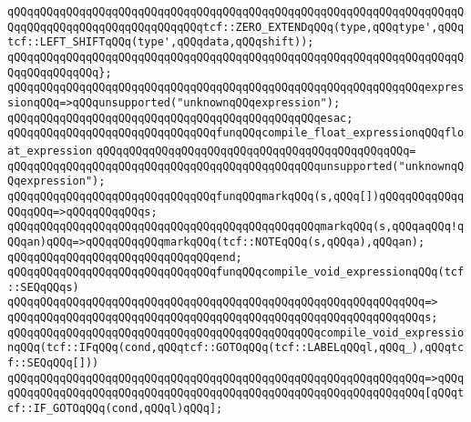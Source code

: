 \verb|qQQqqQQqqQQqqQQqqQQqqQQqqQQqqQQqqQQqqQQqqQQqqQQqqQQqqQQqqQQqqQQqqQQqqQQqqQQqqQQqqQQqqQQqqQQqqQQqqQQqtcf::ZERO_EXTENDqQQq(type,qQQqtype',qQQqtcf::LEFT_SHIFTqQQq(type',qQQqdata,qQQqshift));|\newline
\verb|qQQqqQQqqQQqqQQqqQQqqQQqqQQqqQQqqQQqqQQqqQQqqQQqqQQqqQQqqQQqqQQqqQQqqQQqqQQqqQQqqQQq};|\newline
\newline
\verb|qQQqqQQqqQQqqQQqqQQqqQQqqQQqqQQqqQQqqQQqqQQqqQQqqQQqqQQqqQQqqQQqexpressionqQQq=>qQQqunsupported("unknownqQQqexpression");|\newline
\verb|qQQqqQQqqQQqqQQqqQQqqQQqqQQqqQQqqQQqqQQqqQQqqQQqesac;|\newline
\newline
\newline
\verb|qQQqqQQqqQQqqQQqqQQqqQQqqQQqqQQqfunqQQqcompile_float_expressionqQQqfloat_expression|\newline
\verb|qQQqqQQqqQQqqQQqqQQqqQQqqQQqqQQqqQQqqQQqqQQqqQQq=|\newline
\verb|qQQqqQQqqQQqqQQqqQQqqQQqqQQqqQQqqQQqqQQqqQQqqQQqunsupported("unknownqQQqexpression");|\newline
\newline
\newline
\verb|qQQqqQQqqQQqqQQqqQQqqQQqqQQqqQQqfunqQQqmarkqQQq(s,qQQq[])qQQqqQQqqQQqqQQqqQQq=>qQQqqQQqqQQqs;|\newline
\verb|qQQqqQQqqQQqqQQqqQQqqQQqqQQqqQQqqQQqqQQqqQQqqQQqmarkqQQq(s,qQQqaqQQq!qQQqan)qQQq=>qQQqqQQqqQQqmarkqQQq(tcf::NOTEqQQq(s,qQQqa),qQQqan);|\newline
\verb|qQQqqQQqqQQqqQQqqQQqqQQqqQQqqQQqend;|\newline
\newline
\newline
\verb|qQQqqQQqqQQqqQQqqQQqqQQqqQQqqQQqfunqQQqcompile_void_expressionqQQq(tcf::SEQqQQqs)|\newline
\verb|qQQqqQQqqQQqqQQqqQQqqQQqqQQqqQQqqQQqqQQqqQQqqQQqqQQqqQQqqQQqqQQq=>|\newline
\verb|qQQqqQQqqQQqqQQqqQQqqQQqqQQqqQQqqQQqqQQqqQQqqQQqqQQqqQQqqQQqqQQqs;|\newline
\newline
\verb|qQQqqQQqqQQqqQQqqQQqqQQqqQQqqQQqqQQqqQQqqQQqqQQqcompile_void_expressionqQQq(tcf::IFqQQq(cond,qQQqtcf::GOTOqQQq(tcf::LABELqQQql,qQQq_),qQQqtcf::SEQqQQq[]))|\newline
\verb|qQQqqQQqqQQqqQQqqQQqqQQqqQQqqQQqqQQqqQQqqQQqqQQqqQQqqQQqqQQqqQQq=>qQQq|\newline
\verb|qQQqqQQqqQQqqQQqqQQqqQQqqQQqqQQqqQQqqQQqqQQqqQQqqQQqqQQqqQQqqQQq[qQQqtcf::IF_GOTOqQQq(cond,qQQql)qQQq];|\newline
